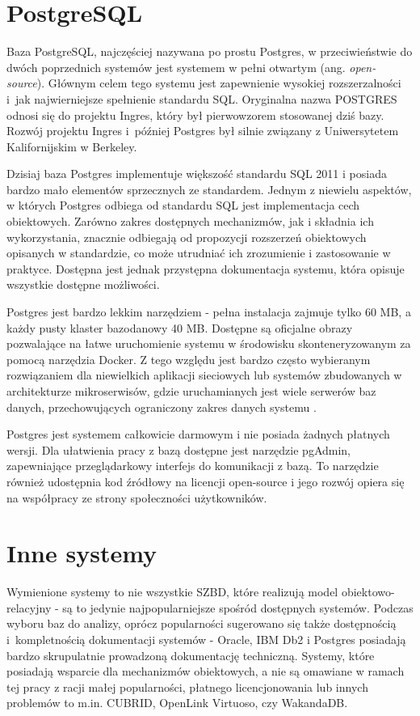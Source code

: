 \documentclass[a4paper,twoside,12pt]{book}
\begin{document}
\section{PostgreSQL}

Baza PostgreSQL, najczęściej nazywana po prostu Postgres, w przeciwieństwie do dwóch poprzednich systemów jest systemem w pełni otwartym (ang. \textit{open-source}). Głównym celem tego systemu jest zapewnienie wysokiej rozszerzalności i~jak najwierniejsze spełnienie standardu SQL. Oryginalna nazwa POSTGRES odnosi się do projektu Ingres, który był pierwowzorem stosowanej dziś bazy. Rozwój projektu Ingres i~później Postgres był silnie związany z Uniwersytetem Kalifornijskim w Berkeley. 

Dzisiaj baza Postgres implementuje większość standardu SQL 2011 i posiada bardzo mało elementów sprzecznych ze standardem. Jednym z niewielu aspektów, w których Postgres odbiega od standardu SQL jest implementacja cech obiektowych. Zarówno zakres dostępnych mechanizmów, jak i składnia ich wykorzystania, znacznie odbiegają od propozycji rozszerzeń obiektowych opisanych w standardzie, co może utrudniać ich zrozumienie i zastosowanie w praktyce. Dostępna jest jednak przystępna dokumentacja systemu, która opisuje wszystkie dostępne możliwości.

Postgres jest bardzo lekkim narzędziem - pełna instalacja zajmuje tylko 60 MB, a każdy pusty klaster bazodanowy 40 MB. Dostępne są oficjalne obrazy pozwalające na łatwe uruchomienie systemu w środowisku skonteneryzowanym za pomocą narzędzia Docker. Z tego względu jest bardzo często wybieranym rozwiązaniem dla niewielkich aplikacji sieciowych lub systemów zbudowanych w architekturze mikroserwisów, gdzie uruchamianych jest wiele serwerów baz danych, przechowujących ograniczony zakres danych systemu \cite{bib:postgres-documentation}. 

Postgres jest systemem całkowicie darmowym i nie posiada żadnych płatnych wersji. Dla ułatwienia pracy z bazą dostępne jest narzędzie pgAdmin, zapewniające przeglądarkowy interfejs do komunikacji z bazą. To narzędzie również udostępnia kod źródłowy na licencji open-source i jego rozwój opiera się na współpracy ze strony społeczności użytkowników.

\section{Inne systemy}

Wymienione systemy to nie wszystkie SZBD, które realizują model obiektowo-relacyjny - są to jedynie najpopularniejsze spośród dostępnych systemów. Podczas wyboru baz do analizy, oprócz popularności sugerowano się także dostępnością i~kompletnością dokumentacji systemów - Oracle, IBM Db2 i Postgres posiadają bardzo skrupulatnie prowadzoną dokumentację techniczną. Systemy, które posiadają wsparcie dla mechanizmów obiektowych, a nie są omawiane w ramach tej pracy z racji małej popularności, płatnego licencjonowania lub innych problemów to m.in. CUBRID, OpenLink Virtuoso, czy WakandaDB.
\end{document}
